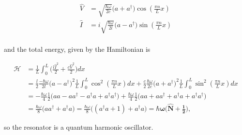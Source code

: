    \begin{align}
	   \hat{V} & = \sqrt{\frac{\hbar\omega}{2c}}\bigg(a+a^\dagger\bigg)\cos(\frac{\pi n}{L}x)\\
	   \hat{I} & = i\sqrt{\frac{\hbar\omega}{2l}}\bigg(a-a^\dagger\bigg)\sin(\frac{\pi n}{L}x)\\
   \end{align}
 
  \noindent and the total energy, given by the Hamiltonian is
  
  \begin{equation}\label{tlineTOtalGamil}
  	\begin{aligned}
  	\mathcal{H} & = \frac{1}{L}\int_{0}^{L}\bigg(\frac{l\hat{I}^2}{2}+\frac{c\hat{V}^2}{2}\bigg)dx \\
  	& = \frac{l}{2}\frac{-\hbar\omega}{2l}\bigg(a-a^{\dagger}\bigg)^2\frac{1}{L}\int_{0}^{L}\cos^2(\frac{\pi n}{L}x)dx + \frac{c}{2}\frac{\hbar\omega}{2c}\bigg(a+a^{\dagger}\bigg)^2\frac{1}{L}\int_{0}^{L}\sin^2(\frac{\pi n}{L}x)dx\\
  	& = -\frac{\hbar\omega}{4}\frac{1}{2}\bigg(aa-aa^{\dagger}-a^{\dagger}a+a^{\dagger}a^{\dagger}\bigg)+\frac{\hbar\omega}{4}\frac{1}{2}\bigg(aa+aa^{\dagger}+a^{\dagger}a+a^{\dagger}a^{\dagger}\bigg)\\
  	& = \frac{\hbar\omega}{8}\bigg(aa^{\dagger}+a^{\dagger}a\bigg)= \frac{\hbar\omega}{8}\bigg((a^{\dagger}a+1)+a^{\dagger}a\bigg)=\mathbf{\hbar\omega\bigg(\hat{N}+\frac{1}{2}\bigg)},
  	\end{aligned}
  \end{equation}
  
  \noindent so the resonator is a quantum harmonic oscillator.
  
\newpage 
